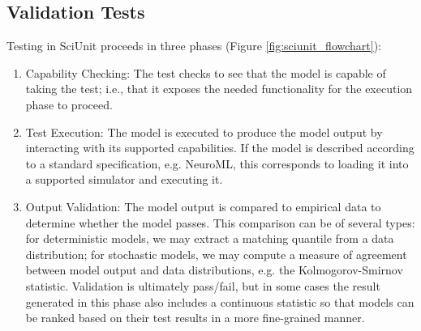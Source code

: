 \documentclass[11pt,letterpaper]{article}
\begin{document}
\subsection{Validation Tests}\label{sec:validation_tests} 
Testing in SciUnit proceeds in three phases (Figure \ref{fig:sciunit_flowchart}): 
\begin{enumerate}
\item Capability Checking: The test checks to see that the model is capable of taking the test; i.e., that it exposes the needed functionality for the execution phase to proceed.
\item Test Execution: The model is executed to produce the model output by interacting with its supported capabilities.  If the model is described according to a standard specification, e.g. NeuroML, this corresponds to loading it into a supported simulator and executing it. 
\item Output Validation: The model output is compared to empirical data to determine whether the model passes.  This comparison can be of several types: for deterministic models, we may extract a matching quantile from a data distribution; for stochastic models, we may compute a measure of agreement between model output and data distributions, e.g. the Kolmogorov-Smirnov statistic.  Validation is ultimately pass/fail, but in some cases the result generated in this phase also includes a continuous statistic so that models can be ranked based on their test results in a more fine-grained manner.   
\end{enumerate}
\end{document}
